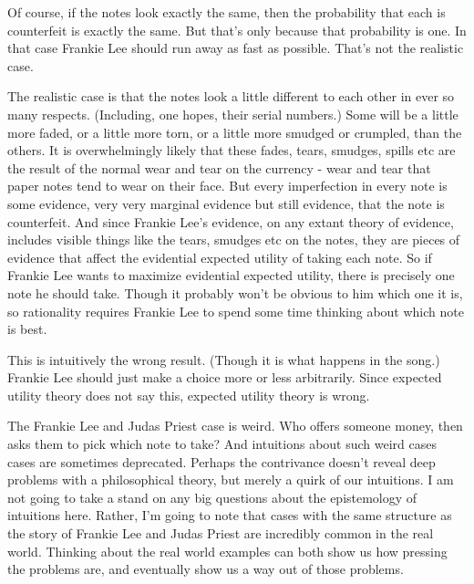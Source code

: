 \documentclass[
  11pt,
  letterpaper,
  DIV=11,
  numbers=noendperiod,
  oneside]{scrartcl}
\begin{document}
Of course, if the notes look exactly the same, then the probability that
each is counterfeit is exactly the same. But that's only because that
probability is one. In that case Frankie Lee should run away as fast as
possible. That's not the realistic case.

The realistic case is that the notes look a little different to each
other in ever so many respects. (Including, one hopes, their serial
numbers.) Some will be a little more faded, or a little more torn, or a
little more smudged or crumpled, than the others. It is overwhelmingly
likely that these fades, tears, smudges, spills etc are the result of
the normal wear and tear on the currency - wear and tear that paper
notes tend to wear on their face. But every imperfection in every note
is some evidence, very very marginal evidence but still evidence, that
the note is counterfeit. And since Frankie Lee's evidence, on any extant
theory of evidence, includes visible things like the tears, smudges etc
on the notes, they are pieces of evidence that affect the evidential
expected utility of taking each note. So if Frankie Lee wants to
maximize evidential expected utility, there is precisely one note he
should take. Though it probably won't be obvious to him which one it is,
so rationality requires Frankie Lee to spend some time thinking about
which note is best.

This is intuitively the wrong result. (Though it is what happens in the
song.) Frankie Lee should just make a choice more or less arbitrarily.
Since expected utility theory does not say this, expected utility theory
is wrong.

The Frankie Lee and Judas Priest case is weird. Who offers someone
money, then asks them to pick which note to take? And intuitions about
such weird cases cases are sometimes deprecated. Perhaps the contrivance
doesn't reveal deep problems with a philosophical theory, but merely a
quirk of our intuitions. I am not going to take a stand on any big
questions about the epistemology of intuitions here. Rather, I'm going
to note that cases with the same structure as the story of Frankie Lee
and Judas Priest are incredibly common in the real world. Thinking about
the real world examples can both show us how pressing the problems are,
and eventually show us a way out of those problems.
\end{document}
